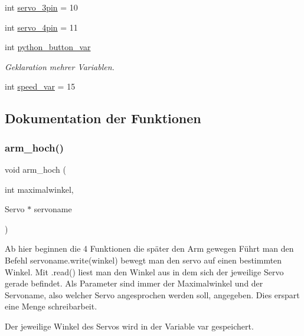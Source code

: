 \begin{DoxyCompactItemize}
\item 
int \hyperlink{_arduino__kommentiert_8ino_a006b96047ca9585e312d88690d5a95a3}{servo\+\_\+3pin} = 10
\item 
int \hyperlink{_arduino__kommentiert_8ino_a5c0d394c06f48072ed4a5cf3f5f3b81b}{servo\+\_\+4pin} = 11
\item 
int \hyperlink{_arduino__kommentiert_8ino_a409d566aad8f36a68f5c2ec46ce59393}{python\+\_\+button\+\_\+var}
\begin{DoxyCompactList}\small\item\em Geklaration mehrer Variablen. \end{DoxyCompactList}\item 
int \hyperlink{_arduino__kommentiert_8ino_a8b03f5396d8e845086daab48dcaca5cb}{speed\+\_\+var} = 15
\end{DoxyCompactItemize}


\subsection{Dokumentation der Funktionen}
\mbox{\label{_arduino__kommentiert_8ino_a74bfcf85e5418694eb99df53d30c8fab}} 
\subsubsection{\texorpdfstring{arm\+\_\+hoch()}{arm\_hoch()}}
{\footnotesize\ttfamily void arm\+\_\+hoch (\begin{DoxyParamCaption}\item[{int}]{maximalwinkel,  }\item[{Servo $\ast$}]{servoname }\end{DoxyParamCaption})}



Ab hier beginnen die 4 Funktionen die später den Arm gewegen Führt man den Befehl servoname.\+write(winkel) bewegt man den servo auf einen bestimmten Winkel. Mit .read() liest man den Winkel aus in dem sich der jeweilige Servo gerade befindet. Als Parameter sind immer der Maximalwinkel und der Servoname, also welcher Servo angesprochen werden soll, angegeben. Dies erspart eine Menge schreibarbeit. 

Der jeweilige Winkel des Servos wird in der Variable var gespeichert.

